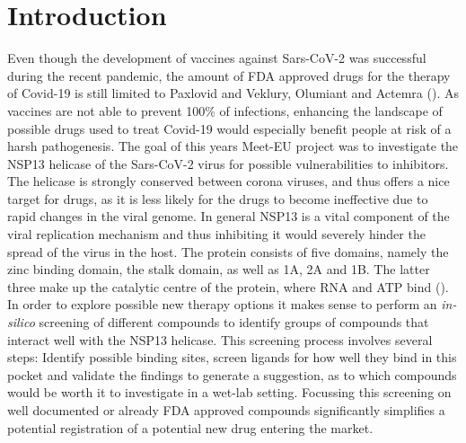 \documentclass[11pt, letterpaper, titlepage]{article}
\renewcommand{\cite}{\parencite}
\begin{document}
\section{Introduction}
Even though the development of vaccines against Sars-CoV-2 was successful during the recent pandemic, the amount of FDA approved drugs for the therapy of Covid-19 is still limited to Paxlovid and Veklury, Olumiant and Actemra (\cite{FDA_COVID}). As vaccines are not able to prevent 100\% of infections, enhancing the landscape of possible drugs used to treat Covid-19 would especially benefit people at risk of a harsh pathogenesis. The goal of this years Meet-EU project was to investigate the \ac{NSP13} helicase of the Sars-CoV-2 virus for possible vulnerabilities to inhibitors. The helicase is strongly conserved between corona viruses, and thus offers a nice target for drugs, as it is less likely for the drugs to become ineffective due to rapid changes in the viral genome. In general \ac{NSP13} is a vital component of the viral replication mechanism and thus inhibiting it would severely hinder the spread of the virus in the host. The protein consists of five domains, namely the zinc binding domain, the stalk domain, as well as 1A, 2A and 1B. The latter three make up the catalytic centre of the protein, where RNA and ATP bind (\cite{NSP13_basics}). \\
In order to explore possible new therapy options it makes sense to perform an \textit{in-silico} screening of different compounds to identify groups of compounds that interact well with the NSP13 helicase. This screening process involves several steps: Identify possible binding sites, screen ligands for how well they bind in this pocket and validate the findings to generate a suggestion, as to which compounds would be worth it to investigate in a wet-lab setting. Focussing this screening on well documented or already FDA approved compounds significantly simplifies a potential registration of a potential new drug entering the market. 
\end{document}
